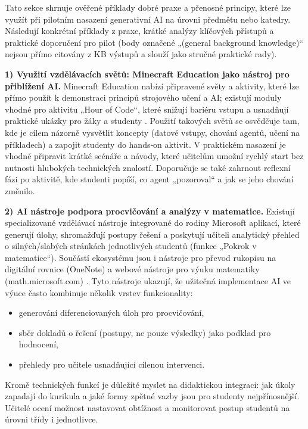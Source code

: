 Tato sekce shrnuje ověřené příklady dobré praxe a přenosné principy, které lze využít při pilotním nasazení generativní AI na úrovni předmětu nebo katedry.
Následují konkrétní příklady z praxe, krátké analýzy klíčových přístupů a praktické doporučení pro pilot (body označené „(general background knowledge)“ nejsou přímo citovány z KB výstupů a slouží jako stručné praktické rady).

\medskip
\textbf{1) Využití vzdělávacích světů: Minecraft Education jako nástroj pro přiblížení AI.}  
Minecraft Education nabízí připravené světy a aktivity, které lze přímo použít k demonstraci principů strojového učení a AI; existují moduly vhodné pro aktivitu „Hour of Code“, které snižují bariéru vstupu a usnadňují praktické ukázky pro žáky a studenty \cite{kb_ai_101_tipu_pdf_04e4a115_page_15_2}.
Použití takových světů se osvědčuje tam, kde je cílem názorně vysvětlit koncepty (datové vstupy, chování agentů, učení na příkladech) a zapojit studenty do hands‑on aktivit.
V praktickém nasazení je vhodné připravit krátké scénáře a návody, které učitelům umožní rychlý start bez nutnosti hlubokých technických znalostí.
Doporučuje se také zahrnout reflexní fázi po aktivitě, kde studenti popíší, co agent „pozoroval“ a jak se jeho chování změnilo.

\medskip
\textbf{2) AI nástroje podpora procvičování a analýzy v matematice.}  
Existují specializované vzdělávací nástroje integrované do rodiny Microsoft aplikací, které generují úlohy, shromažďují postupy řešení a poskytují učiteli analytický přehled o silných/slabých stránkách jednotlivých studentů (funkce „Pokrok v matematice“).
Součástí ekosystému jsou i nástroje pro převod rukopisu na digitální rovnice (OneNote) a webové nástroje pro výuku matematiky (math.microsoft.com) \cite{kb_ai_101_tipu_pdf_04e4a115_page_8_1}.
Tyto nástroje ukazují, že užitečná implementace AI ve výuce často kombinuje několik vrstev funkcionality:
\begin{itemize}
  \item generování diferenciovaných úloh pro procvičování,
  \item sběr dokladů o řešení (postupy, ne pouze výsledky) jako podklad pro hodnocení,
  \item přehledy pro učitele usnadňující cílenou intervenci.
\end{itemize}
Kromě technických funkcí je důležité myslet na didaktickou integraci: jak úkoly zapadají do kurikula a jaké formy zpětné vazby jsou pro studenty nejpřínosnější.
Učitelé ocení možnost nastavovat obtížnost a monitorovat postup studentů na úrovni třídy i jednotlivce.

